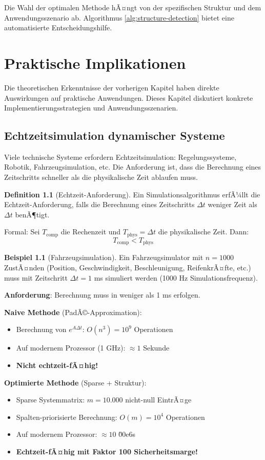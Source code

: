 ﻿\documentclass[a4paper,12pt]{report}
\theoremstyle{definition}
\newtheorem{definition}{Definition}
\newtheorem{beispiel}{Beispiel}
\begin{document}
	Die Wahl der optimalen Methode hÃ¤ngt von der spezifischen Struktur und dem Anwendungsszenario ab. Algorithmus \ref{alg:structure-detection} bietet eine automatisierte Entscheidungshilfe.
	
	\chapter{Praktische Implikationen}
	
	Die theoretischen Erkenntnisse der vorherigen Kapitel haben direkte Auswirkungen auf praktische Anwendungen. Dieses Kapitel diskutiert konkrete Implementierungsstrategien und Anwendungsszenarien.
	
	\section{Echtzeitsimulation dynamischer Systeme}
	
	Viele technische Systeme erfordern Echtzeitsimulation: Regelungssysteme, Robotik, Fahrzeugsimulation, etc. Die Anforderung ist, dass die Berechnung eines Zeitschritts schneller als die physikalische Zeit ablaufen muss.
	
	\begin{definition}[Echtzeit-Anforderung]
		Ein Simulationsalgorithmus erfÃ¼llt die Echtzeit-Anforderung, falls die Berechnung eines Zeitschritts $\Delta t$ weniger Zeit als $\Delta t$ benÃ¶tigt.
		
		Formal: Sei $T_{\text{comp}}$ die Rechenzeit und $T_{\text{phys}} = \Delta t$ die physikalische Zeit. Dann:
		\[
		T_{\text{comp}} < T_{\text{phys}}
		\]
	\end{definition}
	
	\begin{beispiel}[Fahrzeugsimulation]
		Ein Fahrzeugsimulator mit $n = 1000$ ZustÃ¤nden (Position, Geschwindigkeit, Beschleunigung, ReifenkrÃ¤fte, etc.) muss mit Zeitschritt $\Delta t = 1$ ms simuliert werden (1000 Hz Simulationsfrequenz).
		
		\textbf{Anforderung}: Berechnung muss in weniger als 1 ms erfolgen.
		
		\textbf{Naive Methode} (PadÃ©-Approximation):
		\begin{itemize}
			\item Berechnung von $e^{A \Delta t}$: $O(n^3) = 10^9$ Operationen
			\item Auf modernem Prozessor (1 GHz): $\approx 1$ Sekunde
			\item \textbf{Nicht echtzeit-fÃ¤hig!}
		\end{itemize}
		
		\textbf{Optimierte Methode} (Sparse + Struktur):
		\begin{itemize}
			\item Sparse Systemmatrix: $m = 10.000$ nicht-null EintrÃ¤ge
			\item Spalten-priorisierte Berechnung: $O(m) = 10^4$ Operationen
			\item Auf modernem Prozessor: $\approx 10$ \u00e6s
			\item \textbf{Echtzeit-fÃ¤hig mit Faktor 100 Sicherheitsmarge!}
		\end{itemize}
	\end{beispiel}
	
\end{document}
